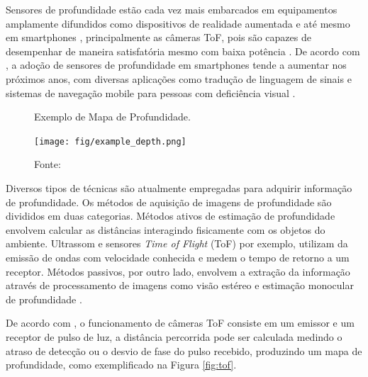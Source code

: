 




Sensores de profundidade estão cada vez mais embarcados em equipamentos amplamente difundidos como dispositivos de realidade aumentada e até mesmo em smartphones \cite{du2020depthlab}, principalmente as câmeras ToF, pois são capazes de desempenhar de maneira satisfatória mesmo com baixa potência \cite{branscombe2018microsoft}. De acordo com \cite{xie2021ultradepth}, a adoção de sensores de profundidade em smartphones tende a aumentar nos próximos anos, com diversas aplicações como tradução de linguagem de sinais \cite{park2021enabling} e sistemas de navegação mobile para pessoas com deficiência visual \cite{see2022smartphone}. 

\begin{figure}[h]
    \centering   
    \caption{Exemplo de Mapa de Profundidade.}
    \texttt{[image: fig/example\_depth.png]}
    \caption*{Fonte: \cite{Silberman:ECCV12}}
    \label{fig:depthmap}
\end{figure}





Diversos tipos de técnicas são atualmente empregadas para adquirir informação de profundidade. Os métodos de aquisição de imagens de profundidade são divididos em duas categorias. Métodos ativos de estimação de profundidade envolvem calcular as distâncias interagindo fisicamente com os objetos do ambiente. Ultrassom e sensores \textit{Time of Flight} (ToF) por exemplo, utilizam da emissão de ondas com velocidade conhecida e medem o tempo de retorno a um receptor. Métodos passivos, por outro lado, envolvem a extração da informação através de processamento de imagens como visão estéreo e estimação monocular de profundidade \cite{khan2020deep}. 

De acordo com , o funcionamento de câmeras ToF consiste em um emissor e um receptor de pulso de luz, a distância percorrida pode ser calculada medindo o atraso de detecção ou o desvio de fase do pulso recebido, produzindo um mapa de profundidade, como exemplificado na Figura \ref{fig:tof}. 

